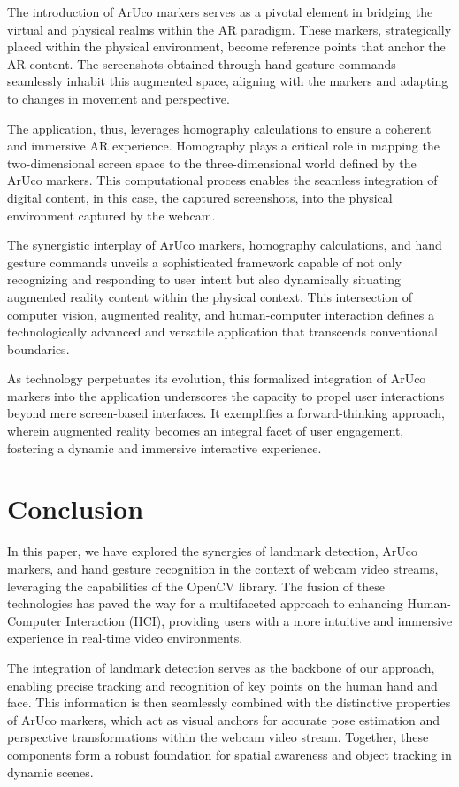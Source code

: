 \documentclass[journal]{IEEEtran}
\begin{document}
The introduction of ArUco markers serves as a pivotal element in bridging the virtual and physical realms within the AR paradigm. 
These markers, strategically placed within the physical environment, become reference points that anchor the AR content. 
The screenshots obtained through hand gesture commands seamlessly inhabit this augmented space, aligning with the markers and adapting 
to changes in movement and perspective.

The application, thus, leverages homography calculations to ensure a coherent and immersive AR experience. Homography plays a 
critical role in mapping the two-dimensional screen space to the three-dimensional world defined by the ArUco markers. This computational 
process enables the seamless integration of digital content, in this case, the captured screenshots, into the physical environment 
captured by the webcam.

The synergistic interplay of ArUco markers, homography calculations, and hand gesture commands unveils a sophisticated framework 
capable of not only recognizing and responding to user intent but also dynamically situating augmented reality content within the 
physical context. This intersection of computer vision, augmented reality, and human-computer interaction defines a technologically 
advanced and versatile application that transcends conventional boundaries.

As technology perpetuates its evolution, this formalized integration of ArUco markers into the application underscores the capacity 
to propel user interactions beyond mere screen-based interfaces. It exemplifies a forward-thinking approach, wherein augmented reality 
becomes an integral facet of user engagement, fostering a dynamic and immersive interactive experience.



\section{Conclusion}
In this paper, we have explored the synergies of landmark detection, ArUco markers, and hand gesture recognition in the context 
of webcam video streams, leveraging the capabilities of the OpenCV library. The fusion of these technologies has paved the way for 
a multifaceted approach to enhancing Human-Computer Interaction (HCI), providing users with a more intuitive and immersive 
experience in real-time video environments.

The integration of landmark detection serves as the backbone of our approach, enabling precise tracking and recognition of 
key points on the human hand and face. This information is then seamlessly combined with the distinctive properties of ArUco markers, 
which act as visual anchors for accurate pose estimation and perspective transformations within the webcam video stream. Together, 
these components form a robust foundation for spatial awareness and object tracking in dynamic scenes.
\end{document}

